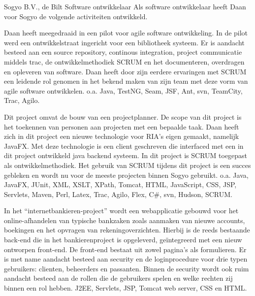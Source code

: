 	\begin{workExperience}{Sogyo B.V., de Bilt}%
	{Software ontwikkelaar}{}
		Als software ontwikkelaar heeft Daan voor Sogyo de volgende
		activiteiten ontwikkeld.
		
		Daan heeft meegedraaid in een pilot voor agile software ontwikkeling. In
		de pilot werd een ontwikkelstraat ingericht voor een bibliotheek
		systeem. Er is aandacht besteed aan	een source repository, continous
		integration, project communicatie middels trac, de ontwikkelmethodiek
		SCRUM en het documenteren, overdragen en opleveren van software.
		Daan heeft door zijn eerdere ervaringen met SCRUM een leidende rol
		genomen in het bekend maken van zijn team met deze vorm van agile
		software ontwikkelen.
		\technics o.a. Java, TestNG, Seam, JSF, Ant, svn, TeamCity, Trac, Agilo.
		
		Dit project omvat de bouw van een projectplanner. De scope van dit
		project is het toekennen van personen aan projecten met een bepaalde
		taak. Daan heeft zich in dit project een nieuwe technologie voor RIA's
		eigen gemaakt, namelijk JavaFX. Met deze technologie is een client
		geschreven die interfaced met een in dit project ontwikkeld java backend
		systeem. In dit project is SCRUM toegepast als ontwikkelmethodiek. Het
		gebruik van SCRUM tijdens dit project is een succes gebleken en wordt nu
		voor de meeste projecten binnen Sogyo gebruikt.
		\technics o.a. Java, JavaFX, JUnit, XML, XSLT, XPath, Tomcat, HTML,
		JavaScript, CSS, JSP, Servlets, Maven, Perl, Latex, Trac, Agilo, Flex,
		C\#, svn, Hudson, SCRUM.

		In het ``internetbankieren-project'' wordt een webapplicatie gebouwd voor
		het online-afhandelen van typische bankzaken zoals aanmaken van nieuwe
		accounts, boekingen en het opvragen van rekeningoverzichten. Hierbij is
		de reeds bestaande back-end die in het bankierenproject is opgeleverd,
		ge\"integreerd met een nieuw ontworpen front-end. De front-end bestaat uit
		zowel pagina's als formulieren. Er is met name aandacht besteed aan
		security en de loginprocedure voor drie typen gebruikers: clienten,
		beheerders en passanten. Binnen de security wordt ook ruim aandacht
		besteed aan de rollen die de gebruikers spelen en welke rechten zij
		binnen een rol hebben.
		\technics J2EE, Servlets, JSP, Tomcat web server, CSS en HTML.
		

\end{workExperience}
